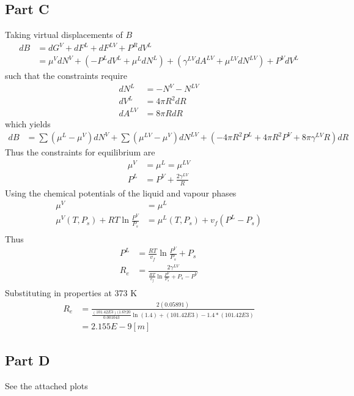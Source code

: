 \documentclass{article}
\begin{document}
\subsection*{Part C}
Taking virtual displacements of $B$
\begin{align*}
dB&=dG^V+dF^L+dF^{LV}+P^R dV^L\\
&=\mu^V dN^V+(-P^LdV^L +\mu ^L dN^L)+(\gamma^{LV}dA^{LV} +\mu ^{LV} dN^{LV})+P^{V}dV^L
\end{align*}
such that the constraints require
\begin{align*}
dN^L&=-N^V-N^{LV}\\
dV^L&=4 \pi R^2 dR\\
dA^{LV}&= 8 \pi R dR
\end{align*}
which yields
\begin{align*}
dB&=\sum(\mu^L-\mu^V)dN^V+\sum(\mu^{LV}-\mu^V)dN^{LV}+(-4\pi R^2P^L+4\pi R^2P^V+8\pi\gamma^{LV}R)dR
\end{align*}
Thus the constraints for equilibrium are
\begin{align*}
\mu^V&=\mu^L=\mu^{LV}\\
P^L &=P^V +\frac{2\gamma^{LV}}{R}
\end{align*}
Using the chemical potentials of the liquid and vapour phases
\begin{align*}
\mu^V&=\mu^L\\
\mu^V(T,P_s)+RT\ln\frac{P^V}{P_s}&=\mu^L(T,P_s)+v_f(P^L-P_s)\\
\end{align*}
Thus
\begin{align*}
P^L&=\frac{RT}{v_f} \ln\frac{P^V}{P_s}+P_s\\
R_e&=\frac{2\gamma^{LV}}{\frac{RT}{v_f} \ln\frac{P^V}{P_s}+P_s-P^V}\\
\end{align*}
Substituting in properties at 373 K
\begin{align*}
R_e&=\frac{2(0.05891)}{\frac{(101.42E3)(1.6720}{0.001043} \ln(1.4)+(101.42E3)-1.4*(101.42E3)}\\
&=2.155E-9 [m]
\end{align*}

\subsection*{Part D}
See the attached plots
\end{document}
